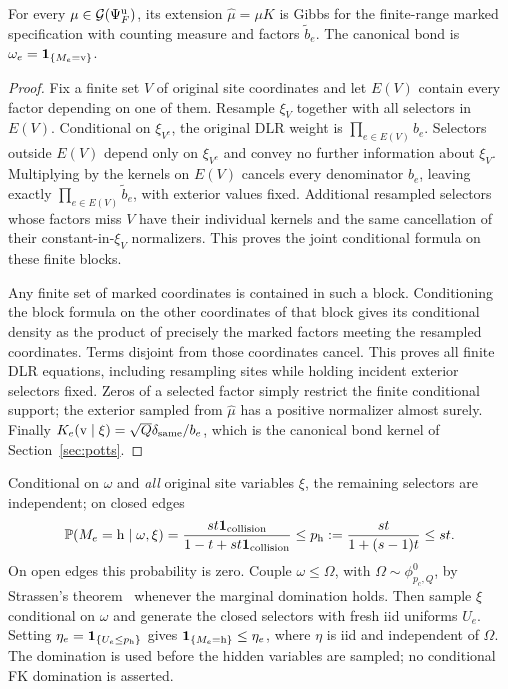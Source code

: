 \begin{lemma}\label{lem:marked}
For every $\mu\in\mathcal G(\Psi_F^{\rm u})$, its extension $\widehat\mu=\mu K$ is Gibbs for the finite-range marked specification with counting measure and factors $\widetilde b_e$. The canonical bond is $\omega_e=\mathbf 1_{\{M_e={\rm v}\}}$.
\end{lemma}
\begin{proof}
Fix a finite set $V$ of original site coordinates and let $E(V)$ contain every factor depending on one of them. Resample $\xi_V$ together with all selectors in $E(V)$. Conditional on $\xi_{V^c}$, the original DLR weight is $\prod_{e\in E(V)}b_e$. Selectors outside $E(V)$ depend only on $\xi_{V^c}$ and convey no further information about $\xi_V$. Multiplying by the kernels on $E(V)$ cancels every denominator $b_e$, leaving exactly $\prod_{e\in E(V)}\widetilde b_e$, with exterior values fixed. Additional resampled selectors whose factors miss $V$ have their individual kernels and the same cancellation of their constant-in-$\xi_V$ normalizers. This proves the joint conditional formula on these finite blocks.

Any finite set of marked coordinates is contained in such a block. Conditioning the block formula on the other coordinates of that block gives its conditional density as the product of precisely the marked factors meeting the resampled coordinates. Terms disjoint from those coordinates cancel. This proves all finite DLR equations, including resampling sites while holding incident exterior selectors fixed. Zeros of a selected factor simply restrict the finite conditional support; the exterior sampled from $\widehat\mu$ has a positive normalizer almost surely. Finally
$K_e({\rm v}\mid\xi)=\sqrt Q\delta_{\rm same}/b_e$, which is the canonical bond kernel of Section~\ref{sec:potts}.
\end{proof}

Conditional on $\omega$ and \emph{all} original site variables $\xi$, the remaining selectors are independent; on closed edges
\begin{equation}\label{eq:hidden-selector}
 \mathbb P(M_e={\rm h}\mid\omega,\xi)
 =\frac{st\mathbf 1_{\rm collision}}{1-t+st\mathbf 1_{\rm collision}}
 \le p_{\rm h}:=\frac{st}{1+(s-1)t}\le st.
\end{equation}
On open edges this probability is zero. Couple $\omega\le\Omega$, with $\Omega\sim\phi^0_{p_c,Q}$, by Strassen's theorem~\cite{Strassen} whenever the marginal domination holds. Then sample $\xi$ conditional on $\omega$ and generate the closed selectors with fresh iid uniforms $U_e$. Setting $\eta_e=\mathbf 1_{\{U_e\le p_{\rm h}\}}$ gives
$\mathbf 1_{\{M_e={\rm h}\}}\le\eta_e$, where $\eta$ is iid and independent of $\Omega$. The domination is used before the hidden variables are sampled; no conditional FK domination is asserted.

